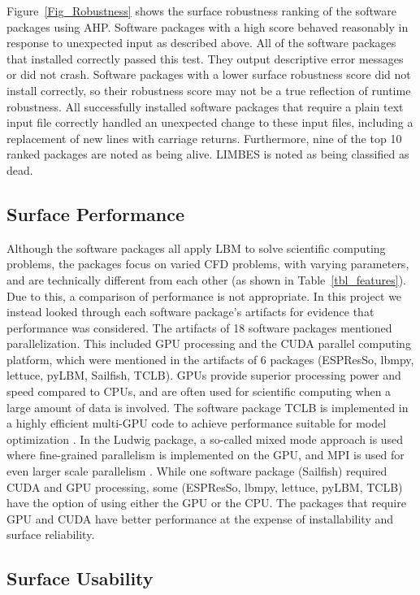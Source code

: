 \documentclass[final, 3p, times, authoryear]{elsarticle}
\begin{document}
Figure~\ref{Fig_Robustness} shows the surface robustness ranking of the software
packages using AHP. Software packages with a high score behaved reasonably in
response to unexpected input as described above. All of the software packages
that installed correctly passed this test. They output descriptive error
messages or did not crash. Software packages with a lower surface robustness
score did not install correctly, so their robustness score may not be a true
reflection of runtime robustness. All successfully installed software packages
that require a plain text input file correctly handled an unexpected change to
these input files, including a replacement of new lines with carriage returns.
Furthermore, nine of the top 10 ranked packages are noted as being alive. LIMBES
is noted as being classified as dead.

\subsection{Surface Performance}

Although the software packages all apply LBM to solve scientific computing
problems, the packages focus on varied CFD problems, with varying parameters,
and are technically different from each other (as shown in
Table~\ref{tbl_features}). Due to this, a comparison of performance is not
appropriate. In this project we instead looked through each software package's
artifacts for evidence that performance was considered. The artifacts of 18
software packages mentioned parallelization. This included GPU processing and
the CUDA parallel computing platform, which were mentioned in the artifacts of 6
packages (ESPResSo, lbmpy, lettuce, pyLBM, Sailfish, TCLB). GPUs provide
superior processing power and speed compared to CPUs, and are often used for
scientific computing when a large amount of data is involved. The software
package TCLB is implemented in a highly efficient multi-GPU code to achieve
performance suitable for model optimization \citep{rutkowski2020open}. In the
Ludwig package, a so-called mixed mode approach is used where fine-grained
parallelism is implemented on the GPU, and MPI is used for even larger scale
parallelism \citep{gray2013ludwig}. While one software package (Sailfish)
required CUDA and GPU processing, some (ESPResSo, lbmpy, lettuce, pyLBM, TCLB)
have the option of using either the GPU or the CPU. The packages that require
GPU and CUDA have better performance at the expense of installability and
surface reliability.

\subsection{Surface Usability}
\end{document}
